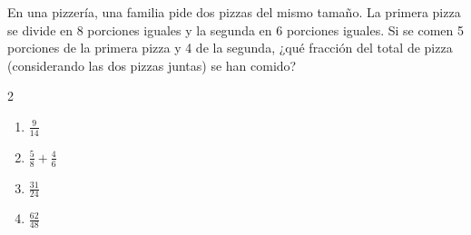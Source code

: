 En una pizzería, una familia pide dos pizzas del mismo tamaño. La primera pizza se divide en 8 porciones iguales y la segunda en 6 porciones iguales. Si se comen 5 porciones de la primera pizza y 4 de la segunda, ¿qué fracción del total de pizza (considerando las dos pizzas juntas) se han comido?
\begin{multicols}{2}
\begin{enumerate}[label=\alph*)]
\item $\frac{9}{14}$
\item $\frac{5}{8} + \frac{4}{6}$
\item $\frac{31}{24}$
\item $\frac{62}{48}$
\end{enumerate}
\end{multicols}